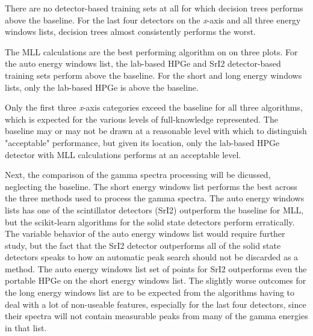 There are no detector-based training sets at all for which decision trees
performs above the baseline. For the last four detectors on the \textit{x}-axis
and all three energy windows lists, decision trees almost consistently performs
the worst. 

The \gls{MLL} calculations are the best performing algorithm on on three plots.
For the auto energy windows list, the lab-based \gls{HPGe} and \gls{SrI2}
detector-based training sets perform above the baseline. For the short and long
energy windows lists, only the lab-based \gls{HPGe} is above the baseline. 

Only the first three \textit{x}-axis categories exceed the baseline for all
three algorithms, which is expected for the various levels of full-knowledge
represented. The baseline may or may not be drawn at a reasonable level with
which to distinguish "acceptable" performance, but given its location, only the
lab-based \gls{HPGe} detector with \gls{MLL} calculations performs at an
acceptable level.

Next, the comparison of the gamma spectra processing will be dicussed,
neglecting the baseline.  The short energy windows list performs the best
across the three methods used to process the gamma spectra. The auto energy
windows lists has one of the scintillator detectors (\gls{SrI2}) outperform the
baseline for \gls{MLL}, but the scikit-learn algorithms for the solid state
detectors perform erratically.  The variable behavior of the auto energy
windows list would require further study, but the fact that the \gls{SrI2}
detector outperforms all of the solid state detectors speaks to how an
automatic peak search should not be discarded as a method.  The auto energy
windows list set of points for \gls{SrI2} outperforms even the portable
\gls{HPGe} on the short energy windows list.  The slightly worse outcomes for
the long energy windows list are to be expected from the algorithms having to
deal with a lot of non-useable features, 
especially for the last four detectors, since their spectra will not contain
measurable peaks from many of the gamma energies in that list. 

